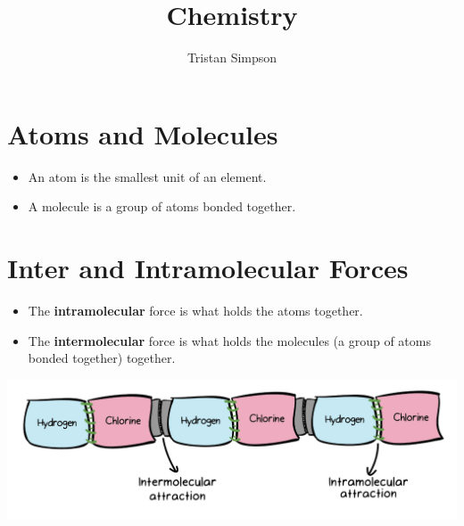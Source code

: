 \documentclass{article}
\title{Chemistry}
\author{Tristan Simpson}
\begin{document}
\maketitle
\tableofcontents

\section{Atoms and Molecules}
\begin{itemize}
    \item An atom is the smallest unit of an element.
    \item A molecule is a group of atoms bonded together.
\end{itemize}

\section{Inter and Intramolecular Forces}
\begin{itemize}
    \item The \textbf{intramolecular} force is what holds the atoms together.
    \item The \textbf{intermolecular} force is what holds the molecules (a group of atoms bonded together) together.
\end{itemize}
\includegraphics[scale=0.33]{images/molecularforces.png}
\end{document}

